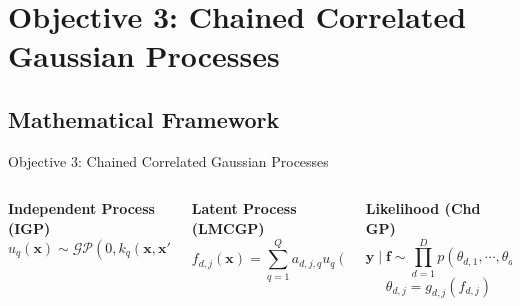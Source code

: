 \section*{Objective 3: Chained Correlated Gaussian Processes}

\subsection{Mathematical Framework}

\begin{frame}{Objective 3: Chained Correlated Gaussian Processes}
	\scriptsize
	\centering
	\setlength{} 
	\setlength{}
		
	\vspace{-0.6em}
	\begin{columns}[T] %
		\begin{column}{0.33\textwidth}
			\centering	
			\textcolor{mygreen}{
			\textbf{Independent Process (IGP)}
			\vspace{-1.3em}
			\begin{equation*}
				u_{q}(\mathbf{x}) \sim \mathcal{GP}(0, k_{q}(\mathbf{x}, \mathbf{x}'))
			\end{equation*}
			}
		\end{column}
		
		\begin{column}{0.33\textwidth}
			\centering
			\textcolor{myblue}{
				\textbf{Latent Process (LMCGP)}
				\vspace{-1.3em}
			\begin{equation*}
				f_{d,j}(\mathbf{x}) = \sum_{q=1}^Q a_{d,j,q} u_{q}(\mathbf{x})
			\end{equation*}
			}
		\end{column}
		
		\begin{column}{0.33\textwidth}
			\centering
			\textcolor{myred}{
				\textbf{Likelihood (Chd GP)}
				\vspace{-1.3em}
			\begin{equation*}
				\mathbf{y} \mid \mathbf{f} \sim \prod_{d=1}^D p(\theta_{d, 1}, \cdots, \theta_{d, J_d})
			\end{equation*}
			\vspace{-1.5em}
			\begin{equation*}
				\theta_{d, j} = g_{d, j}(f_{d, j})
			\end{equation*}
			}
		\end{column}
		
	\end{columns}
\end{frame}



